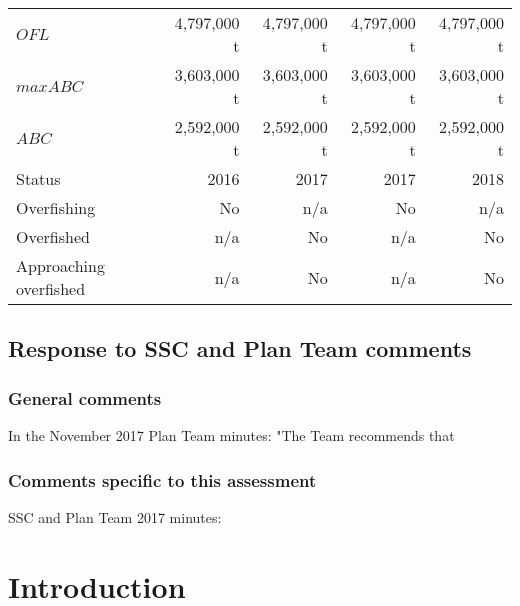 \documentclass[11pt,]{article}
\begin{document}
\begin{table}[ht]
\begin{tabular}{lrr|rr}
$OFL$                                 &  4,797,000 t &  4,797,000 t &  4,797,000 t & 4,797,000 t \\
$maxABC$                              &  3,603,000 t &  3,603,000 t &  3,603,000 t & 3,603,000 t \\
$ABC$                                 &  2,592,000 t &  2,592,000 t & 2,592,000 t & 2,592,000 t \\
\hline
Status                               & 2016       & 2017       &  2017             & 2018          \\
\hline
Overfishing                           & No         & n/a       & No                        & n/a                 \\
Overfished                           & n/a         & No       & n/a                        & No                  \\
Approaching overfished               & n/a         & No       & n/a                        & No                  \\
\hline
\end{tabular}
\end{table}

\hypertarget{response-to-ssc-and-plan-team-comments}{%
\subsection{Response to SSC and Plan Team
comments}\label{response-to-ssc-and-plan-team-comments}}

\hypertarget{general-comments}{%
\subsubsection{General comments}\label{general-comments}}

In the November 2017 Plan Team minutes: "The Team recommends that

\hypertarget{comments-specific-to-this-assessment}{%
\subsubsection{Comments specific to this
assessment}\label{comments-specific-to-this-assessment}}

SSC and Plan Team 2017 minutes:

\hypertarget{introduction}{%
\section{Introduction}\label{introduction}}
\end{document}
